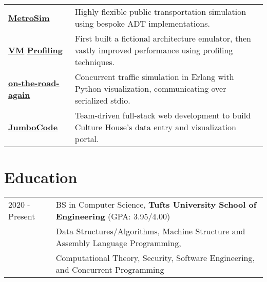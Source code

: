 \documentclass[letter,10pt]{article}
\begin{document}
\begin{tabularx}{\linewidth}{@{}l X@{}}
\href{}{\textbf{MetroSim}} & Highly flexible public transportation simulation using bespoke ADT implementations. \\[3.75pt]
\href{https://github.com/liam-strand/hw6-um}{\textbf{VM}} \href{https://github.com/liam-strand/hw7-profiling}{\textbf{Profiling}} & First built a fictional architecture emulator, then vastly improved performance using profiling techniques. \\[3.75pt]
\href{https://github.com/liam-strand/cs-21-final-project}{\textbf{on-the-road-again}} & Concurrent traffic simulation in Erlang with Python visualization, communicating over serialized stdio. \\[3.75pt]
\href{}{\textbf{JumboCode}} & Team-driven full-stack web development to build Culture House's data entry and visualization portal. \\[3.75pt]
\end{tabularx}

\section{Education}
\begin{tabularx}{\linewidth}{@{}l X@{}}	
2020 - Present & BS in Computer Science, \textbf{Tufts University School of Engineering} \hfill \normalsize (GPA: 3.95/4.00) \\
    & \footnotesize{Data Structures/Algorithms, Machine Structure and Assembly Language Programming,} \\
    & \footnotesize{Computational Theory, Security, Software Engineering, and Concurrent Programming}
\end{tabularx}



\vfill
{}
\end{document}
